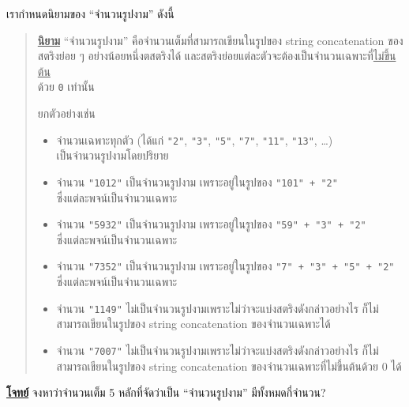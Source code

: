 \question{}

เรากำหนดนิยามของ ``จำนวนรูปงาม'' ดังนี้

\begin{quote}
    \textbf{\uline{นิยาม}} ``จำนวนรูปงาม'' คือจำนวนเต็มที่สามารถเขียนในรูปของ 
    string concatenation ของสตริงย่อย ๆ อย่างน้อยหนึ่งตสตริงได้ 
    และสตริงย่อยแต่ละตัวจะต้องเป็นจำนวนเฉพาะที่\uline{ไม่ขึ้นต้น}\\
    ด้วย \verb|0| เท่านั้น
    
    ยกตัวอย่างเช่น
    \begin{itemize}
    \item จำนวนเฉพาะทุกตัว ({\hrsp}ได้แก่ \verb|"2"|, \verb|"3"|, \verb|"5"|, \verb|"7"|, 
        \verb|"11"|, \verb|"13"|, \ldots\hrsp) \\ เป็นจำนวนรูปงามโดยปริยาย
    \item จำนวน \verb|"1012"| เป็นจำนวนรูปงาม เพราะอยู่ในรูปของ \verb|"101" + "2"| \\ 
        ซึ่งแต่ละพจน์เป็นจำนวนเฉพาะ
    \item จำนวน \verb|"5932"| เป็นจำนวนรูปงาม เพราะอยู่ในรูปของ \verb|"59" + "3" + "2"| \\
        ซึ่งแต่ละพจน์เป็นจำนวนเฉพาะ
    \item จำนวน \verb|"7352"| เป็นจำนวนรูปงาม เพราะอยู่ในรูปของ \verb|"7" + "3" + "5" + "2"| \\
        ซึ่งแต่ละพจน์เป็นจำนวนเฉพาะ
    \item จำนวน \verb|"1149"| ไม่เป็นจำนวนรูปงามเพราะไม่ว่าจะแบ่งสตริงดังกล่าวอย่างไร 
        ก็ไม่สามารถเขียนในรูปของ string concatenation ของจำนวนเฉพาะได้
    \item จำนวน \verb|"7007"| ไม่เป็นจำนวนรูปงามเพราะไม่ว่าจะแบ่งสตริงดังกล่าวอย่างไร 
        ก็ไม่สามารถเขียนในรูปของ string concatenation ของจำนวนเฉพาะที่ไม่ขึ้นต้นด้วย 0 ได้
    \end{itemize}
\end{quote}

\noindent
\textbf{\uline{โจทย์}} จงหาว่าจำนวนเต็ม 5 หลักที่จัดว่าเป็น ``จำนวนรูปงาม'' มีทั้งหมดกี่จำนวน?
